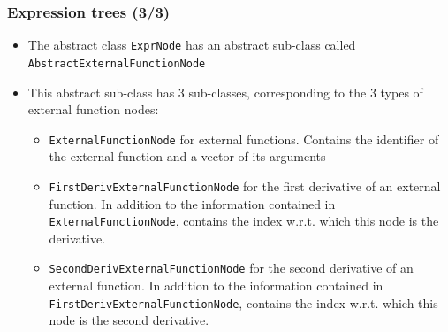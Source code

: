 \documentclass{beamer}
\begin{document}
\begin{frame}
  \frametitle{Expression trees (3/3)}
  \begin{itemize}
  \item The abstract class \texttt{ExprNode} has an abstract sub-class called \texttt{AbstractExternalFunctionNode}
  \item This abstract sub-class has 3 sub-classes, corresponding to the 3 types of external function nodes:
    \begin{itemize}
    \item \texttt{ExternalFunctionNode} for external functions. Contains the identifier of the external function and a vector of its arguments
    \item \texttt{FirstDerivExternalFunctionNode} for the first derivative of an external function. In addition to the information contained in \texttt{ExternalFunctionNode}, contains the index w.r.t. which this node is the derivative.
    \item \texttt{SecondDerivExternalFunctionNode} for the second derivative of an external function. In addition to the information contained in \texttt{FirstDerivExternalFunctionNode}, contains the index w.r.t. which this node is the second derivative.
    \end{itemize}
  \end{itemize}
\end{frame}
\end{document}
